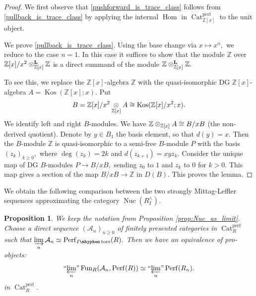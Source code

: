 \documentclass[11pt,leqno]{amsart}
\newtheorem{prop}[theo]{Proposition}
\numberwithin{equation}{section}
\def\bL{\mathbb{L}}
\def\Z{\mathbb{Z}}
\def\bL{{\mathbf L}}
\def\Hom{\operatorname{Hom}}
\newcommand{\tens}[1]{%
  \mathbin{\mathop{\otimes}\displaylimits_{#1}}%
}
\newcommand{\Ltens}[1]{%
  \mathbin{\mathop{\otimes}\displaylimits^{\bL}_{#1}}%
}
\newcommand{\hy}{\mhyphen}
\newcommand{\indlim}[1][]{\mathop{\varinjlim}\limits_{#1}}
\newcommand{\prolim}[1][]{\mathop{\varprojlim}\limits_{#1}}
\newcommand{\proolim}[1][]{{``{\prolim[#1]}"}}
\newcommand{\Nuc}{\operatorname{Nuc}}
\newcommand{\Cat}{\operatorname{Cat}}
\newcommand{\cA}{{\mathcal A}}
\newcommand{\Fun}{\operatorname{Fun}}
\newcommand{\Perf}{\operatorname{Perf}}
\newcommand{\perf}{\operatorname{perf}}
\newcommand{\Kos}{\operatorname{Kos}}
\newcommand{\tors}{\operatorname{tors}}
\begin{document}
\begin{proof}
We first observe that \ref{pushforward_is_trace_class} follows from \ref{pullback_is_trace_class}  by applying the internal $\Hom$ in $\Cat_{\Z[x]}^{\perf}$ to the unit object.

We prove \ref{pullback_is_trace_class}. Using the base change via $x\mapsto x^n,$ we reduce to the case $n=1.$ In this case it suffices to show that the module $\Z$ over $\Z[x]/x^2\Ltens{\Z[x]}\Z$ is a direct summand of the module $\Z\Ltens{\Z[x]}\Z.$ 

To see this, we replace the $\Z[x]$-algebra $\Z$ with the quasi-isomorphic DG $\Z[x]$-algebra $A=\Kos(\Z[x];x).$ Put $$B=\Z[x]/x^2\tens{\Z[x]}A\cong\Kos(\Z[x]/x^2;x).$$ We identify left and right $B$-modules. We have $\Z\tens{\Z[x]}A\cong B/xB$ (the non-derived quotient). Denote by $y\in B_1$ the basis element, so that $d(y)=x.$ Then the $B$-module $\Z$ is quasi-isomorphic to a semi-free $B$-module $P$ with the basis $(z_k)_{k\geq 0},$ where $\deg(z_k)=2k$ and $d(z_{k+1})=xyz_k.$ Consider the unique map of DG $B$-modules $P\to B/xB,$ sending $z_0$ to $1$ and $z_k$ to $0$ for $k>0.$ This map gives a section of the map $B/xB\to\Z$ in $D(B).$ This proves the lemma. 
\end{proof}

We obtain the following comparison between the two strongly Mittag-Leffler sequences approximating the category $\Nuc(R^{\wedge}_I).$

\begin{prop}\label{prop:derived_quotients_pro_equiv_to_functors_from_approx} We keep the notation from Proposition \ref{prop:Nuc_as_limit}. Choose a direct sequence $(\cA_n)_{n\geq 0}$ of finitely presented categories in $\Cat_R^{\perf}$ such that $\indlim[n]\cA_n\simeq \Perf_{I\hy\tors}(R).$ Then we have an equivalence of pro-objects:
\begin{equation}\label{eq:pro_equiv_of_ML}
\proolim[n]\Fun_R(\cA_n,\Perf(R))\simeq \proolim[n]\Perf(R_n).
\end{equation}
in $\Cat_R^{\perf}.$
\end{prop}
\end{document}
